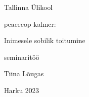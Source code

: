 \begin{titlepage}
\par{Tallinna Ülikool}
\vspace{0.3\textheight}
\par{peacecop kalmer:}
\LARGE
\par{Inimesele sobilik toitumine }
\normalsize
\par{seminaritöö}
\vspace{0.3\textheight}
\begin{flushright}
\par{Tiina Lõugas}
\end{flushright}
\vfill
Harku
\hfill
2023
\end{titlepage}
